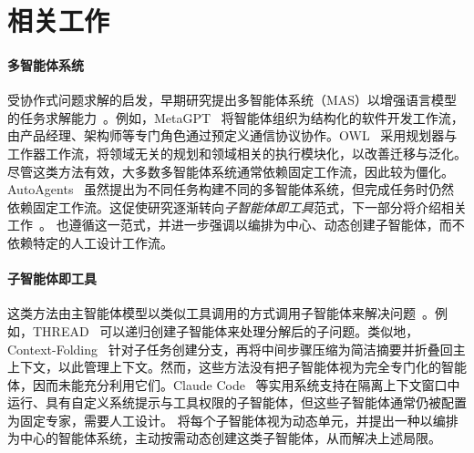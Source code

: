 \section{相关工作}
\paragraph{多智能体系统}
受协作式问题求解的启发，早期研究提出多智能体系统（MAS）以增强语言模型的任务求解能力~\cite{zhang2025agentorchestra, DBLP:journals/corr/abs-2505-07437,wu2024autogen, shi2025aime, gao2025single, zhu2025oagents, fang2025cognitive, zhang2024aflow,DBLP:conf/icml/Li0FXC0L25}。例如，MetaGPT~\cite{hong2023metagpt} 将智能体组织为结构化的软件开发工作流，由产品经理、架构师等专门角色通过预定义通信协议协作。OWL~\cite{hu2025owl} 采用规划器与工作器工作流，将领域无关的规划和领域相关的执行模块化，以改善迁移与泛化。尽管这类方法有效，大多数多智能体系统通常依赖固定工作流，因此较为僵化。AutoAgents~\cite{chen2023autoagents} 虽然提出为不同任务构建不同的多智能体系统，但完成任务时仍然依赖固定工作流。这促使研究逐渐转向\emph{子智能体即工具}范式，下一部分将介绍相关工作~\cite{gao2025evolvesurvey, gao2025single}。\our{} 也遵循这一范式，并进一步强调以编排为中心、动态创建子智能体，而不依赖特定的人工设计工作流。

\paragraph{子智能体即工具}
这类方法由主智能体模型以类似工具调用的方式调用子智能体来解决问题~\cite{li2025chain, su2025toolorchestra, grand2025self,DBLP:journals/tkde/LiuSLMJZFLTL25}。例如，THREAD~\cite{schroeder2025thread} 可以递归创建子智能体来处理分解后的子问题。类似地，Context-Folding~\cite{sun2025scaling} 针对子任务创建分支，再将中间步骤压缩为简洁摘要并折叠回主上下文，以此管理上下文。然而，这些方法没有把子智能体视为完全专门化的智能体，因而未能充分利用它们。Claude Code~\cite{anthropic_claude_code_subagents} 等实用系统支持在隔离上下文窗口中运行、具有自定义系统提示与工具权限的子智能体，但这些子智能体通常仍被配置为固定专家，需要人工设计。\our{} 将每个子智能体视为动态单元，并提出一种以编排为中心的智能体系统，主动按需动态创建这类子智能体，从而解决上述局限。
